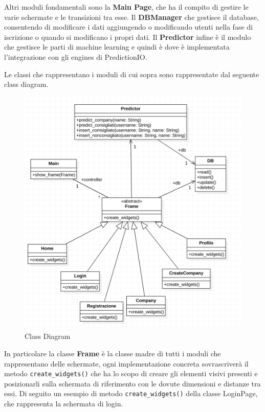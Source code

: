 Altri moduli fondamentali sono la \textbf{Main Page}, che ha il compito di gestire le varie schermate e le transizioni tra esse. Il \textbf{DBManager} che gestisce il database, consentendo di modificare i dati aggiungendo o modificando utenti nella fase di iscrizione o quando si modificano i propri dati. Il \textbf{Predictor} infine è il modulo che gestisce le parti di machine learning e quindi è dove è implementata l'integrazione con gli engines di PredictionIO.

Le classi che rappresentano i moduli di cui sopra sono rappresentate dal seguente class diagram.

\newpage

\begin{figure}[!h]
\includegraphics[width=1.0\textwidth]{immagini/classdiagram.png}
\caption{Class Diagram}
\label{fig:classdiagram}
\end{figure}

In particolare la classe \textbf{Frame} è la classe madre di tutti i moduli che rappresentano delle schermate, ogni implementazione concreta sovrascriverà il metodo \verb+create_widgets()+ che ha lo scopo di creare gli elementi visivi presenti e posizionarli sulla schermata di riferimento con le dovute dimensioni e distanze tra essi. Di seguito un esempio di metodo \verb+create_widgets()+ della classe LoginPage, che rappresenta la schermata di login. 


